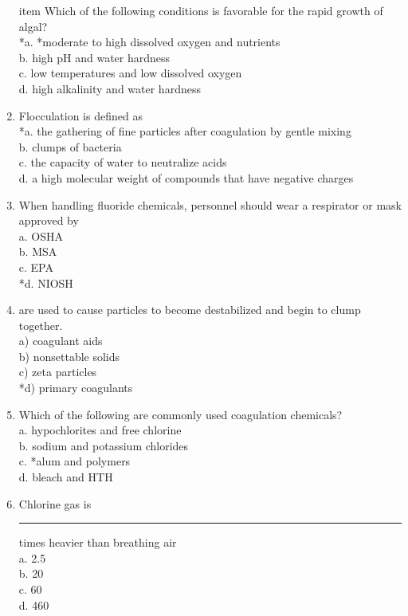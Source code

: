 \begin{enumerate}
item Which of the following conditions is favorable for the rapid growth of algal?\\
*a. *moderate to high dissolved oxygen and nutrients\\
b. high $\mathrm{pH}$ and water hardness\\
c. low temperatures and low dissolved oxygen\\
d. high alkalinity and water hardness\\

  \item Flocculation is defined as\\
*a. the gathering of fine particles after coagulation by gentle mixing\\
b. clumps of bacteria\\
c. the capacity of water to neutralize acids\\
d. a high molecular weight of compounds that have negative charges\\




\item When handling fluoride chemicals, personnel should wear a respirator or mask approved by\\
a.  OSHA\\
b.  MSA\\
c.  EPA\\
*d.  NIOSH

 \item are used to cause particles to become destabilized and begin to clump together.\\
a) coagulant aids\\
b) nonsettable solids\\
c) zeta particles\\
*d) primary coagulants\\

  \item Which of the following are commonly used coagulation chemicals?\\
a. hypochlorites and free chlorine\\
b. sodium and potassium chlorides\\
c. *alum and polymers\\
d. bleach and HTH\\

  \item Chlorine gas is \rule{1.5cm}{0.5pt} times heavier than breathing air\\
a. 2.5\\
b. 20\\
c. 60\\
d. 460\\


\end{enumerate}
